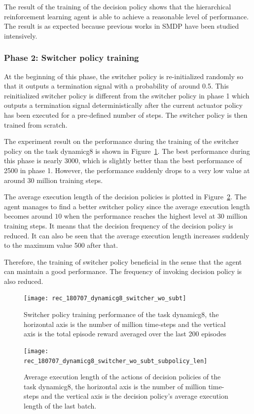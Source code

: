The result of the training of the decision policy shows that the hierarchical reinforcement learning agent is able to achieve a reasonable level of performance. The result is as expected because previous works in SMDP have been studied intensively.

\subsubsection{Phase 2: Switcher policy training}
At the beginning of this phase, the switcher policy is re-initialized randomly so that it outputs a termination signal with a probability of around 0.5. This reinitialized switcher policy is different from the switcher policy in phase 1 which outputs a termination signal deterministically after the current actuator policy has been executed for a pre-defined number of steps. The switcher policy is then trained from scratch.

The experiment result on the performance during the training of the switcher policy on the task dynamicg8 is shown in Figure~\ref{fig:rec_dynamicg8_switcher}. The best performance during this phase is nearly 3000, which is slightly better than the best performance of 2500 in phase 1. However, the performance suddenly drops to a very low value at around 30 million training steps.

The average execution length of the decision policies is plotted in Figure~\ref{fig:rec_dynamicg8_avesubt}. The agent manages to find a better switcher policy since the average execution length becomes around $10$ when the performance reaches the highest level at 30 million training steps. It means that the decision frequency of the decision policy is reduced. It can also be seen that the average execution length increases suddenly to the maximum value 500 after that.

Therefore, the training of switcher policy beneficial in the sense that the agent can maintain a good performance. The frequency of invoking decision policy is also reduced.
\begin{figure}[!htbp]
	\centering
	\texttt{[image: rec\_180707\_dynamicg8\_switcher\_wo\_subt]}
	\caption{Switcher policy training performance of the task dynamicg8, the horizontal axis is the number of million time-steps and the vertical axis is the total episode reward averaged over the last 200 episodes}
	\label{fig:rec_dynamicg8_switcher}
\end{figure}

\begin{figure}[!htbp]
	\centering
	\texttt{[image: rec\_180707\_dynamicg8\_switcher\_wo\_subt\_subpolicy\_len]}
	\caption{Average execution length of the actions of decision policies of the task dynamicg8, the horizontal axis is the number of million time-steps and the vertical axis is the decision policy's average execution length of the last batch.}
	\label{fig:rec_dynamicg8_avesubt}
\end{figure}

